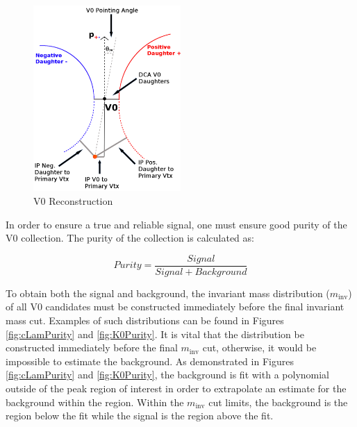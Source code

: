 \documentclass[../AnalysisNoteJBuxton.tex]{subfiles}
\begin{document}
\begin{figure}[h]
  \centering
  \includegraphics[width=0.5\textwidth]{3_DataSelection/Figures/V0CutsGeneral.pdf}
  \caption[V0 Reconstruction]{V0 Reconstruction}
  \label{fig:V0Reconstruction}
\end{figure}


In order to ensure a true and reliable signal, one must ensure good purity of the V0 collection.  The purity of the collection is calculated as:

\begin{equation}
 Purity = \frac{Signal}{Signal + Background}
\label{eqn:Purity}
\end{equation}

To obtain both the signal and background, the invariant mass distribution ($m_{\mathrm{inv}}$) of all V0 candidates must be constructed immediately before the final invariant mass cut.
Examples of such distributions can be found in Figures \ref{fig:cLamPurity} and \ref{fig:K0Purity}.
It is vital that the distribution be constructed immediately before the final $m_{\mathrm{inv}}$ cut, otherwise, it would be impossible to estimate the background.
As demonstrated in Figures \ref{fig:cLamPurity} and \ref{fig:K0Purity}, the background is fit with a polynomial outside of the peak region of interest in order to extrapolate an estimate for the background within the region.
Within the $m_{\mathrm{inv}}$ cut limits, the background is the region below the fit while the signal is the region above the fit.




\end{document}

